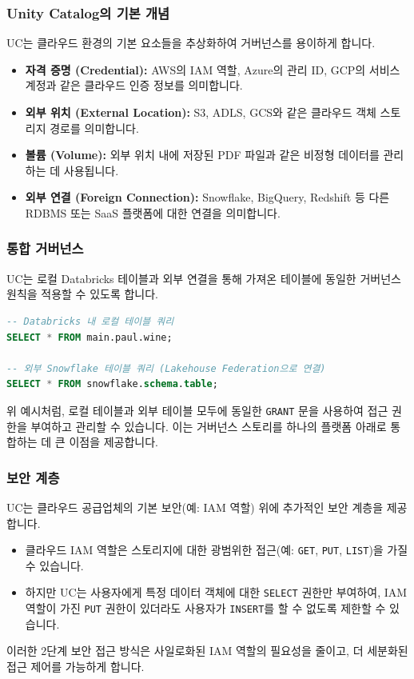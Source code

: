 \documentclass[11pt,a4paper]{article}
\theoremstyle{definition}
\begin{document}
\subsubsection*{Unity Catalog의 기본 개념}
UC는 클라우드 환경의 기본 요소들을 추상화하여 거버넌스를 용이하게 합니다.
\begin{itemize}
    \item \textbf{자격 증명 (Credential):} AWS의 IAM 역할, Azure의 관리 ID, GCP의 서비스 계정과 같은 클라우드 인증 정보를 의미합니다.
    \item \textbf{외부 위치 (External Location):} S3, ADLS, GCS와 같은 클라우드 객체 스토리지 경로를 의미합니다.
    \item \textbf{볼륨 (Volume):} 외부 위치 내에 저장된 PDF 파일과 같은 비정형 데이터를 관리하는 데 사용됩니다.
    \item \textbf{외부 연결 (Foreign Connection):} Snowflake, BigQuery, Redshift 등 다른 RDBMS 또는 SaaS 플랫폼에 대한 연결을 의미합니다.
\end{itemize}

\subsubsection*{통합 거버넌스}
UC는 로컬 Databricks 테이블과 외부 연결을 통해 가져온 테이블에 동일한 거버넌스 원칙을 적용할 수 있도록 합니다.
\begin{lstlisting}[caption={Unity Catalog를 통한 통합 쿼리 예시}, label={lst:unified_query}, language=SQL]
-- Databricks 내 로컬 테이블 쿼리
SELECT * FROM main.paul.wine;

-- 외부 Snowflake 테이블 쿼리 (Lakehouse Federation으로 연결)
SELECT * FROM snowflake.schema.table;
\end{lstlisting}
위 예시처럼, 로컬 테이블과 외부 테이블 모두에 동일한 \texttt{GRANT} 문을 사용하여 접근 권한을 부여하고 관리할 수 있습니다. 이는 거버넌스 스토리를 하나의 플랫폼 아래로 통합하는 데 큰 이점을 제공합니다.

\subsubsection*{보안 계층}
UC는 클라우드 공급업체의 기본 보안(예: IAM 역할) 위에 추가적인 보안 계층을 제공합니다.
\begin{itemize}
    \item 클라우드 IAM 역할은 스토리지에 대한 광범위한 접근(예: \texttt{GET}, \texttt{PUT}, \texttt{LIST})을 가질 수 있습니다.
    \item 하지만 UC는 사용자에게 특정 데이터 객체에 대한 \texttt{SELECT} 권한만 부여하여, IAM 역할이 가진 \texttt{PUT} 권한이 있더라도 사용자가 \texttt{INSERT}를 할 수 없도록 제한할 수 있습니다.
\end{itemize}
이러한 2단계 보안 접근 방식은 사일로화된 IAM 역할의 필요성을 줄이고, 더 세분화된 접근 제어를 가능하게 합니다.
\end{document}
